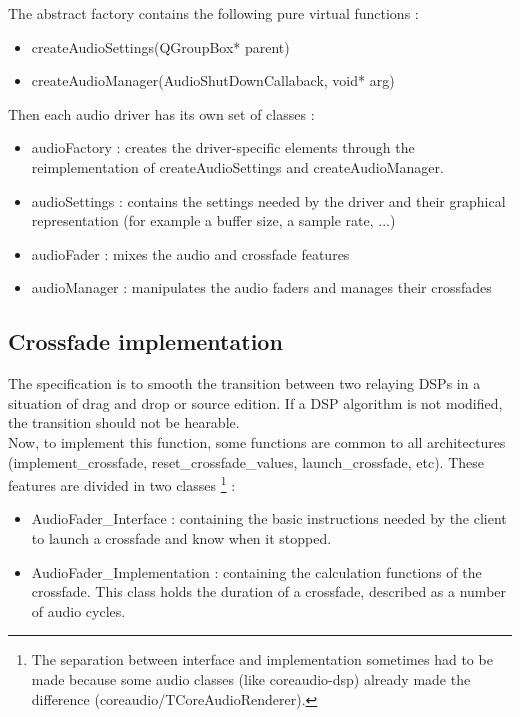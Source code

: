\documentclass[a4paper]{article}
\begin{document}
{The abstract factory contains the following pure virtual functions :
\begin{itemize}
\item createAudioSettings(QGroupBox* parent)
\item createAudioManager(AudioShutDownCallaback, void* arg)
\end{itemize}

Then each audio driver has its own set of classes :
\begin{itemize}
\item audioFactory : creates the driver-specific elements through the reimplementation of createAudioSettings and createAudioManager. 
\item audioSettings : contains the settings needed by the driver and their graphical representation (for example a buffer size, a sample rate, ...)
\item audioFader : mixes the audio and crossfade features
\item audioManager : manipulates the audio faders and manages their crossfades 
\end{itemize}

\subsection{Crossfade implementation}

The specification is to smooth the transition between two relaying DSPs in a situation of drag and drop or source edition. If a DSP algorithm is not modified, the transition should not be hearable. \\

Now, to implement this function, some functions are common to all architectures (implement\_crossfade, reset\_crossfade\_values, launch\_crossfade, etc). These features are divided in two classes \footnote{The separation between interface and implementation sometimes had to be made because some audio classes (like coreaudio-dsp) already made the difference (coreaudio/TCoreAudioRenderer). } :
\begin{itemize}
\item AudioFader\_Interface : containing the basic instructions needed by the client to launch a crossfade and know when it stopped. 
\item AudioFader\_Implementation : containing the calculation functions of the crossfade. This class holds the duration of a crossfade, described as a number of audio cycles.
\end{itemize}

}
\end{document}

